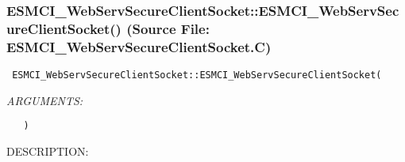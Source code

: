  
\setlength{\oldparskip}{\parskip}
\setlength{\parskip}{1.5ex}
\setlength{\oldparindent}{\parindent}
\setlength{\parindent}{0pt}
\setlength{\oldbaselineskip}{\baselineskip}
\setlength{\baselineskip}{11pt}
 
\def\bv{\begin{verbatim}}
\def\ev{\end{verbatim}}
\def\be{\begin{equation}}
\def\ee{\end{equation}}
\def\bea{\begin{eqnarray}}
\def\eea{\end{eqnarray}}
\def\bi{\begin{itemize}}
\def\ei{\end{itemize}}
\def\bn{\begin{enumerate}}
\def\en{\end{enumerate}}
\def\bd{\begin{description}}
\def\ed{\end{description}}
\def\({\left (}
\def\){\right )}
\def\[{\left [}
\def\]{\right ]}
\def\<{\left  \langle}
\def\>{\right \rangle}
\def\cI{{\cal I}}
\def\diag{\mathop{\rm diag}}
\def\tr{\mathop{\rm tr}}


 
\subsubsection{ESMCI\_WebServSecureClientSocket::ESMCI\_WebServSecureClientSocket() (Source File: ESMCI\_WebServSecureClientSocket.C)}


  
\begin{verbatim} ESMCI_WebServSecureClientSocket::ESMCI_WebServSecureClientSocket(\end{verbatim}{\em ARGUMENTS:}
\begin{verbatim}   )\end{verbatim}
{\sf DESCRIPTION:\\ }


